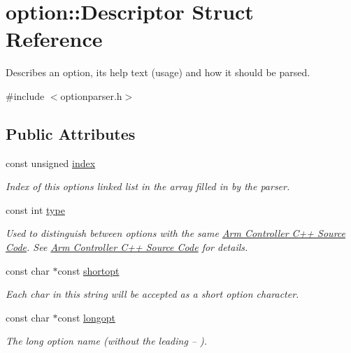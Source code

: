 \hypertarget{structoption_1_1Descriptor}{}\section{option\+:\+:Descriptor Struct Reference}
\label{structoption_1_1Descriptor}


Describes an option, its help text (usage) and how it should be parsed.  




{\ttfamily \#include $<$optionparser.\+h$>$}

\subsection*{Public Attributes}
\begin{DoxyCompactItemize}
\item 
const unsigned \hyperlink{structoption_1_1Descriptor_a1fee8ac44f529c99ac2b1149b4c391b1}{index}
\begin{DoxyCompactList}\small\item\em Index of this option\textquotesingle{}s linked list in the array filled in by the parser. \end{DoxyCompactList}\item 
const int \hyperlink{structoption_1_1Descriptor_a1b220dabd8aad075fa441a80f9b9343c}{type}
\begin{DoxyCompactList}\small\item\em Used to distinguish between options with the same \hyperlink{index}{Arm Controller C++ Source Code}. See \hyperlink{index}{Arm Controller C++ Source Code} for details. \end{DoxyCompactList}\item 
const char $\ast$const \hyperlink{structoption_1_1Descriptor_a0dba4ccca59c19d6ed4081391fca5adb}{shortopt}
\begin{DoxyCompactList}\small\item\em Each char in this string will be accepted as a short option character. \end{DoxyCompactList}\item 
const char $\ast$const \hyperlink{structoption_1_1Descriptor_a470c449dfa894c9bfda2dae026142b4b}{longopt}
\begin{DoxyCompactList}\small\item\em The long option name (without the leading {\ttfamily --} ). \end{DoxyCompactList}\item 

\end{DoxyCompactItemize}
